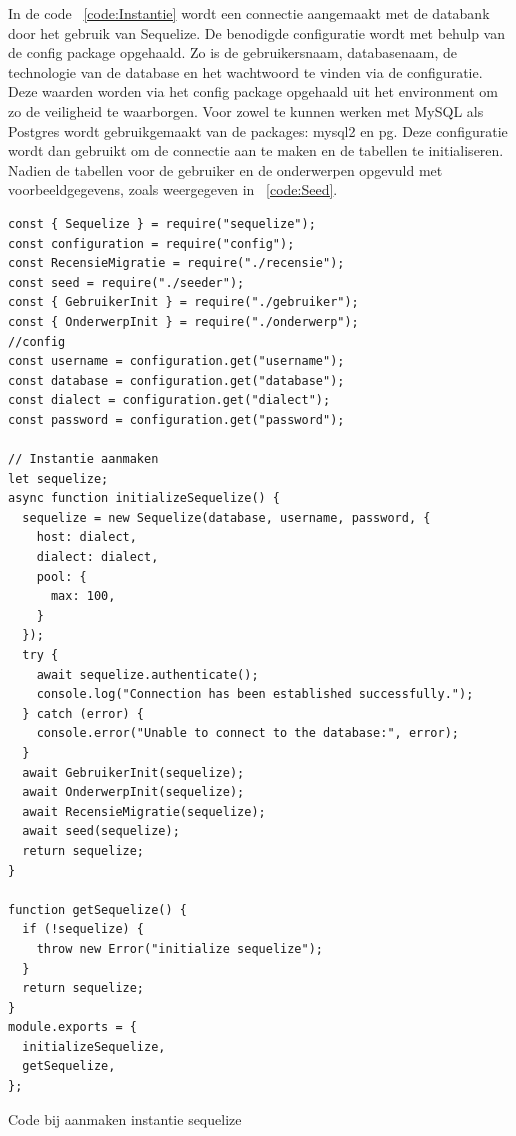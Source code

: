 In de code ~\ref{code:Instantie} wordt een connectie aangemaakt met de databank door het gebruik van Sequelize. 
De benodigde configuratie wordt met behulp van de config package opgehaald. Zo is de 
gebruikersnaam, databasenaam, de technologie van de database en het wachtwoord te vinden via de configuratie.
Deze waarden worden via het config package opgehaald uit het environment om zo de veiligheid te waarborgen.
Voor zowel te kunnen werken met MySQL als Postgres wordt gebruikgemaakt van de packages: mysql2 en pg.
Deze configuratie wordt dan gebruikt om de connectie aan te maken en de tabellen te initialiseren.
Nadien  de tabellen voor de gebruiker en de onderwerpen opgevuld met voorbeeldgegevens, zoals weergegeven in ~\ref{code:Seed}.

\begin{listing}[H]
  \centering
  \begin{verbatim}
const { Sequelize } = require("sequelize");
const configuration = require("config");
const RecensieMigratie = require("./recensie");
const seed = require("./seeder");
const { GebruikerInit } = require("./gebruiker");
const { OnderwerpInit } = require("./onderwerp");
//config
const username = configuration.get("username");
const database = configuration.get("database");
const dialect = configuration.get("dialect");
const password = configuration.get("password");

// Instantie aanmaken
let sequelize;
async function initializeSequelize() {
  sequelize = new Sequelize(database, username, password, {
    host: dialect,
    dialect: dialect,
    pool: {
      max: 100,
    }
  });
  try {
    await sequelize.authenticate();
    console.log("Connection has been established successfully.");
  } catch (error) {
    console.error("Unable to connect to the database:", error);
  }
  await GebruikerInit(sequelize);
  await OnderwerpInit(sequelize);
  await RecensieMigratie(sequelize);
  await seed(sequelize);
  return sequelize;
}

function getSequelize() {
  if (!sequelize) {
    throw new Error("initialize sequelize");
  }
  return sequelize;
}
module.exports = {
  initializeSequelize,
  getSequelize,
};
\end{verbatim}
\caption[Sequelize instantie]{\label{code:Instantie}Code bij aanmaken instantie sequelize}
\end{listing}

